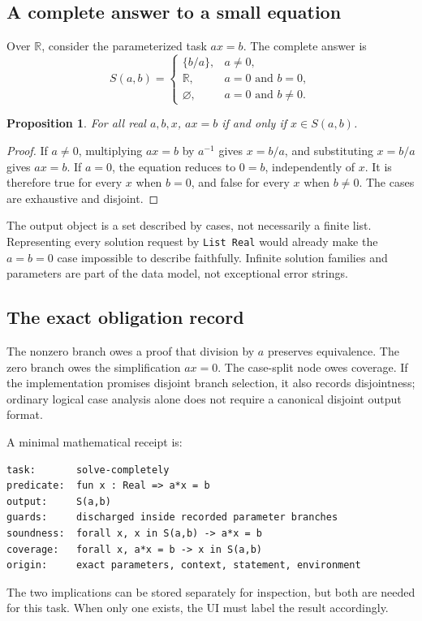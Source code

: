 \documentclass[11pt,letterpaper]{article}
\newcommand{\code}[1]{\nolinkurl{#1}}
\newcommand{\R}{\mathbb R}
\newtheorem{proposition}{Proposition}[section]
\theoremstyle{definition}
\begin{document}
\subsection{A complete answer to a small equation}
Over \(\R\), consider the parameterized task \(ax=b\). The complete answer is
\[
 S(a,b)=
 \begin{cases}
 \{b/a\},&a\ne0,\\
 \R,&a=0\text{ and }b=0,\\
 \varnothing,&a=0\text{ and }b\ne0.
 \end{cases}
\]

\begin{proposition}
For all real \(a,b,x\), \(ax=b\) if and only if \(x\in S(a,b)\).
\end{proposition}
\begin{proof}
If \(a\ne0\), multiplying \(ax=b\) by \(a^{-1}\) gives \(x=b/a\), and substituting
\(x=b/a\) gives \(ax=b\). If \(a=0\), the equation reduces to \(0=b\), independently
of \(x\). It is therefore true for every \(x\) when \(b=0\), and false for every
\(x\) when \(b\ne0\). The cases are exhaustive and disjoint.
\end{proof}

The output object is a set described by cases, not necessarily a finite list.
Representing every solution request by \code{List Real} would already make the
\(a=b=0\) case impossible to describe faithfully. Infinite solution families and
parameters are part of the data model, not exceptional error strings.

\subsection{The exact obligation record}
The nonzero branch owes a proof that division by \(a\) preserves equivalence.
The zero branch owes the simplification \(ax=0\). The case-split node owes
coverage. If the implementation promises disjoint branch selection, it also
records disjointness; ordinary logical case analysis alone does not require a
canonical disjoint output format.

A minimal mathematical receipt is:
\begin{lstlisting}
task:       solve-completely
predicate:  fun x : Real => a*x = b
output:     S(a,b)
guards:     discharged inside recorded parameter branches
soundness:  forall x, x in S(a,b) -> a*x = b
coverage:   forall x, a*x = b -> x in S(a,b)
origin:     exact parameters, context, statement, environment
\end{lstlisting}
The two implications can be stored separately for inspection, but both are needed
for this task. When only one exists, the UI must label the result accordingly.
\end{document}
